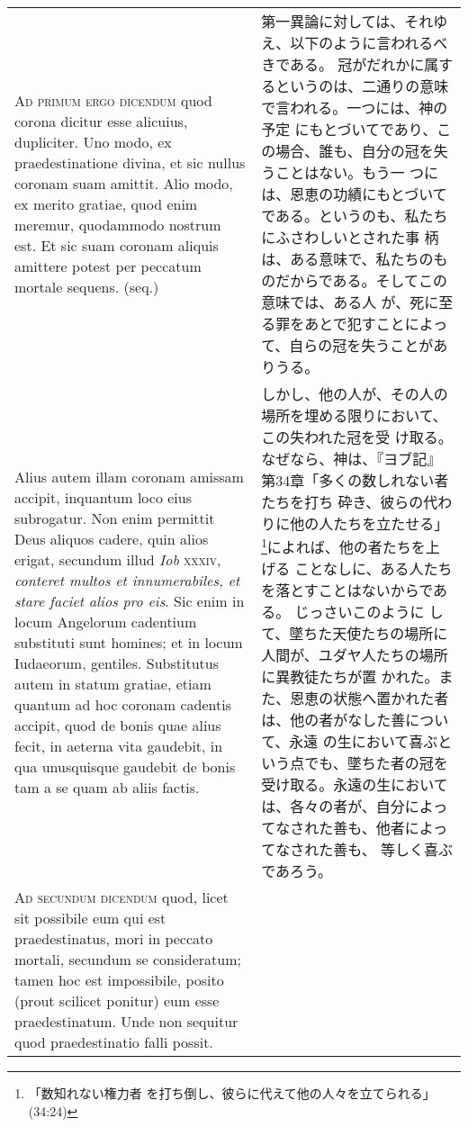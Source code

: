 \documentclass[10pt]{jsarticle} %
\begin{document}
\begin{longtable}{p{21em}p{21em}}
\\


{\scshape Ad primum ergo dicendum} quod corona dicitur
esse alicuius, dupliciter. Uno modo, ex praedestinatione divina, et sic
nullus coronam suam amittit. Alio modo, ex merito gratiae, quod enim
meremur, quodammodo nostrum est. Et sic suam coronam aliquis amittere
potest per peccatum mortale sequens. (seq.)


&

第一異論に対しては、それゆえ、以下のように言われるべきである。
冠がだれかに属するというのは、二通りの意味で言われる。一つには、神の予定
 にもとづいてであり、この場合、誰も、自分の冠を失うことはない。もう一
 つには、恩恵の功績にもとづいてである。というのも、私たちにふさわしいとされた事
 柄は、ある意味で、私たちのものだからである。そしてこの意味では、ある人
 が、死に至る罪をあとで犯すことによって、自らの冠を失うことがありうる。


\\

Alius autem illam coronam amissam
accipit, inquantum loco eius subrogatur. Non enim permittit Deus aliquos
cadere, quin alios erigat, secundum illud {\itshape Iob} {\scshape xxxiv}, {\itshape conteret multos et
innumerabiles, et stare faciet alios pro eis}.
Sic enim in locum
Angelorum cadentium substituti sunt homines; et in locum Iudaeorum,
gentiles. Substitutus autem in statum gratiae, etiam quantum ad hoc
coronam cadentis accipit, quod de bonis quae alius fecit, in aeterna
vita gaudebit, in qua unusquisque gaudebit de bonis tam a se quam ab
aliis factis.


&
 しかし、他の人が、その人の場所を埋める限りにおいて、この失われた冠を受
 け取る。なぜなら、神は、『ヨブ記』第34章「多くの数しれない者たちを打ち
 砕き、彼らの代わりに他の人たちを立たせる」\footnote{「数知れない権力者
 を打ち倒し、彼らに代えて他の人々を立てられる」(34:24)}によれば、他の者たちを上げる
 ことなしに、ある人たちを落とすことはないからである。
じっさいこのように
 して、墜ちた天使たちの場所に人間が、ユダヤ人たちの場所に異教徒たちが置
 かれた。また、恩恵の状態へ置かれた者は、他の者がなした善について、永遠
 の生において喜ぶという点でも、墜ちた者の冠を受け取る。永遠の生において
 は、各々の者が、自分によってなされた善も、他者によってなされた善も、
 等しく喜ぶであろう。


\\


{\scshape Ad secundum dicendum} quod, licet sit
possibile eum qui est praedestinatus, mori in peccato mortali, secundum
se consideratum; tamen hoc est impossibile, posito (prout scilicet
ponitur) eum esse praedestinatum. Unde non sequitur quod praedestinatio
falli possit.


\end{longtable}
\end{document}
